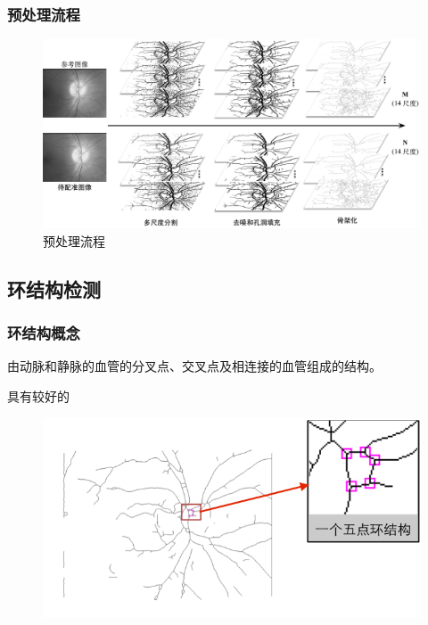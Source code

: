 \documentclass[notheorems,mathserif,table,compress]{beamer}  %
\begin{document}
\begin{frame}
\frametitle{预处理流程}
 \begin{figure}[ht!]
   \centering
  \includegraphics[width=\linewidth]{预处理}
  \caption{预处理流程}
 \end{figure}
\end{frame}

\subsection{环结构检测}

 \begin{frame}
 \frametitle{环结构概念}
 由动脉和静脉的血管的分叉点、交叉点及相连接的血管组成的结构。
 
 具有较好的
  \begin{figure}[ht!]
    \centering
  \includegraphics[width=0.75\linewidth]{五点环.png}
 \end{figure}
\setlength{\fboxsep}{2pt}%
\centering
{}
\end{frame}
\end{document}
